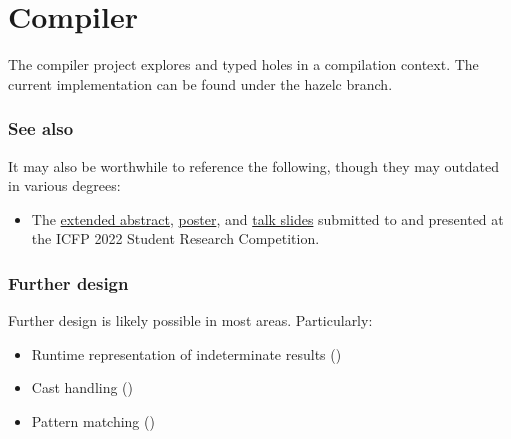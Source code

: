 \documentclass{article}
\begin{document}
\setcounter{section}{13}
\section{Compiler}
The compiler project explores \Hazel{} and typed holes in a compilation context. The current
implementation can be found under the \textsf{hazelc} branch. 

\subsubsection{See also}
\label{see-also}
It may also be worthwhile to reference the following, though they may outdated in various degrees:
%
\begin{itemize}
  \item The \href{https://github.com/hazelgrove/hazelc-icfp22-src}{extended abstract},
    \href{https://github.com/mirryi/hazelc-icfp22-poster}{poster}, and
    \href{https://github.com/mirryi/hazelc-icfp22-slides}{talk slides} submitted to and presented at
    the ICFP 2022 Student Research Competition.
\end{itemize}

\subsubsection{Further design}
\label{further-design}
Further design is likely possible in most areas. Particularly:
\begin{itemize}
  \item Runtime representation of indeterminate results ()
  \item Cast handling ()
  \item Pattern matching ()
\end{itemize}


\end{document}
